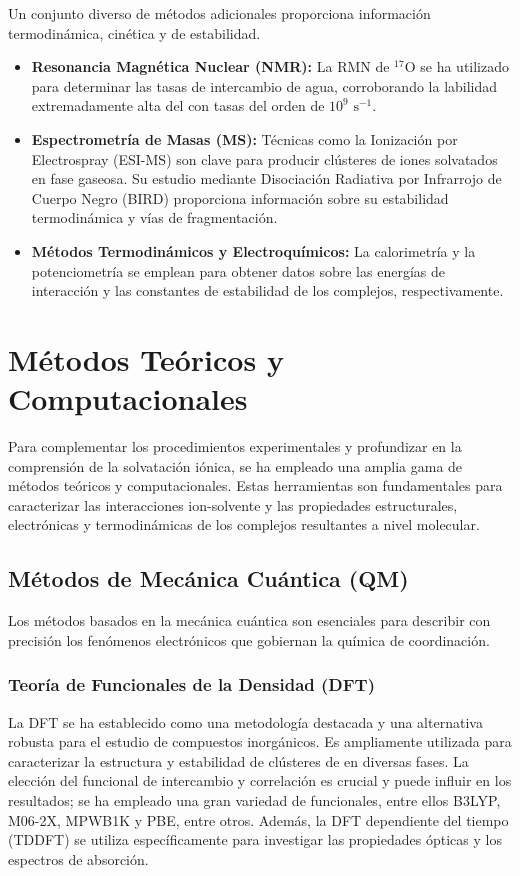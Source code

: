 Un conjunto diverso de métodos adicionales proporciona información termodinámica, cinética y de estabilidad.
\begin{itemize}
    \item \textbf{Resonancia Magnética Nuclear (NMR):} La RMN de $^{17}\text{O}$ se ha utilizado para determinar las tasas de intercambio de agua, corroborando la labilidad extremadamente alta del  con tasas del orden de $10^9 \text{ s}^{-1}$.
    \item \textbf{Espectrometría de Masas (MS):} Técnicas como la Ionización por Electrospray (ESI-MS) son clave para producir clústeres de iones solvatados en fase gaseosa. Su estudio mediante Disociación Radiativa por Infrarrojo de Cuerpo Negro (BIRD) proporciona información sobre su estabilidad termodinámica y vías de fragmentación.
    \item \textbf{Métodos Termodinámicos y Electroquímicos:} La calorimetría y la potenciometría se emplean para obtener datos sobre las energías de interacción y las constantes de estabilidad de los complejos, respectivamente.
\end{itemize}


\section{Métodos Teóricos y Computacionales}

Para complementar los procedimientos experimentales y profundizar en la comprensión de la solvatación iónica, se ha empleado una amplia gama de métodos teóricos y computacionales. Estas herramientas son fundamentales para caracterizar las interacciones ion-solvente y las propiedades estructurales, electrónicas y termodinámicas de los complejos resultantes a nivel molecular.

\subsection*{Métodos de Mecánica Cuántica (QM)}
Los métodos basados en la mecánica cuántica son esenciales para describir con precisión los fenómenos electrónicos que gobiernan la química de coordinación.

\subsubsection*{Teoría de Funcionales de la Densidad (DFT)}
La DFT se ha establecido como una metodología destacada y una alternativa robusta para el estudio de compuestos inorgánicos. Es ampliamente utilizada para caracterizar la estructura y estabilidad de clústeres de  en diversas fases. La elección del funcional de intercambio y correlación es crucial y puede influir en los resultados; se ha empleado una gran variedad de funcionales, entre ellos B3LYP, M06-2X, MPWB1K y PBE, entre otros. Además, la DFT dependiente del tiempo (TDDFT) se utiliza específicamente para investigar las propiedades ópticas y los espectros de absorción.

